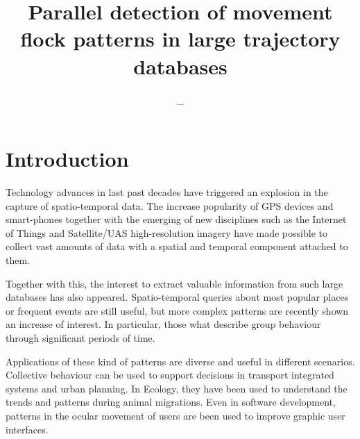 \documentclass[12pt]{scrartcl}
\title{Parallel detection of movement flock patterns in large trajectory databases}
\author{_}
\begin{document}
\maketitle
 
\section{Introduction}
Technology advances in last past decades have triggered an explosion in the capture of spatio-temporal data.  The increase popularity of GPS devices and smart-phones together with the emerging of new disciplines such as the Internet of Things and Satellite/UAS high-resolution imagery have made possible to collect vast amounts of data with a spatial and temporal component attached to them.

Together with this, the interest to extract valuable information from such large databases has also appeared.  Spatio-temporal queries about most popular places or frequent events are still useful, but more complex patterns are recently shown an increase of interest.  In particular, those what describe group behaviour through significant periods of time.

Applications of these kind of patterns are diverse and useful in different scenarios.  Collective behaviour can be used to support decisions in transport integrated systems and urban planning.  In Ecology, they have been used to understand the trends and patterns during animal migrations.  Even in software development, patterns in the ocular movement of users are been used to improve graphic user interfaces. 
\end{document}
